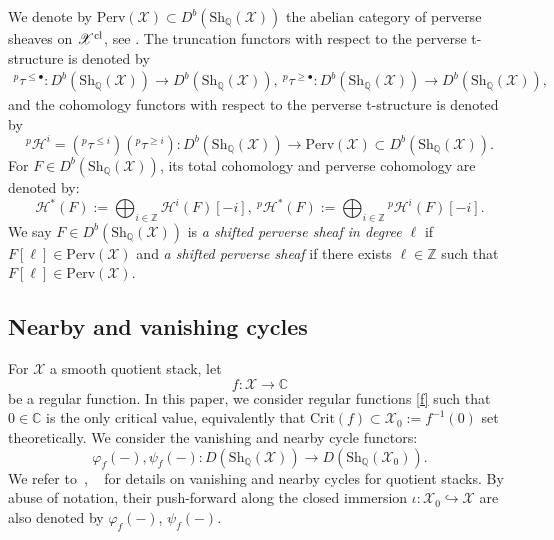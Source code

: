 \documentclass [11pt,oneside,a4paper,mathscr]{amsart}
\theoremstyle{definition}
\renewcommand{\leq}{\leqslant}
\renewcommand{\geq}{\geqslant}
\newcommand{\X}{\mathscr{X}}
\begin{document}
We denote by $\mathrm{Perv}(\X)\subset D^b(\mathrm{Sh}_{\mathbb{Q}}(\X))$ the abelian category of perverse sheaves on $\X^{\rm{cl}}$, see \cite{MR2480756}. 
The truncation functors with respect to the perverse 
t-structure is denoted by 
\begin{align*}
{}^p\tau^{\leq \bullet}\colon D^b(\mathrm{Sh}_{\mathbb{Q}}(\X))\to D^b(\mathrm{Sh}_{\mathbb{Q}}(\X)), \
{}^p\tau^{\geq \bullet}\colon D^b(\mathrm{Sh}_{\mathbb{Q}}(\X))\to D^b(\mathrm{Sh}_{\mathbb{Q}}(\X)),
\end{align*}
and the cohomology 
functors with respect to the perverse t-structure is denoted by 
\[
{}^p\mathcal{H}^i=({}^p\tau^{\leq i})
({}^p\tau^{\geq i})
\colon D^b(\mathrm{Sh}_{\mathbb{Q}}(\X))\to \mathrm{Perv}(\X) \subset D^b(\mathrm{Sh}_{\mathbb{Q}}(\X)).\] 
For $F\in D^b(\mathrm{Sh}_{\mathbb{Q}}(\X))$, its total cohomology and perverse cohomology are denoted by: 
\[
\mathcal{H}^{\ast}(F):=\bigoplus_{i\in \mathbb{Z}}\mathcal{H}^i(F)[-i], \ 
{}^p\mathcal{H}^{\ast}(F):=\bigoplus_{i\in\mathbb{Z}}{}^p\mathcal{H}^i(F)[-i].\]
We say $F\in D^b(\mathrm{Sh}_{\mathbb{Q}}(\X))$ is \textit{a shifted perverse sheaf in degree $\ell$} if $F[\ell]\in \mathrm{Perv}(\X)$ and \textit{a shifted perverse sheaf} if there exists $\ell\in\mathbb{Z}$ such that $F[\ell]\in \mathrm{Perv}(\X)$. 









\subsection{Nearby and vanishing cycles}\label{subsec:nearby}
For $\X$ a smooth quotient stack, let 
\begin{equation}\label{f}
f\colon \X\to\mathbb{C}
\end{equation}
be a regular function. In this paper, we consider regular functions \eqref{f} such that $0 \in \mathbb{C}$ is the only critical value, equivalently that $\mathrm{Crit}(f)\subset \X_0:=f^{-1}(0)$ set 
theoretically.
We consider the vanishing and nearby cycle functors:
\begin{equation}\label{psiphi}
\varphi_f(-), \psi_f(-)\colon D(\mathrm{Sh}_{\mathbb{Q}}(\X))\to D(\mathrm{Sh}_{\mathbb{Q}}(\X_0)).
\end{equation}
We refer to~\cite[Subsection 2.2]{MR3667216}, ~\cite[Proposition 2.13]{DM}
for details on vanishing and nearby cycles
for quotient stacks. 
By abuse of notation, their push-forward along the closed 
immersion $\iota\colon \X_0 \hookrightarrow\X$ 
are also denoted by $\varphi_f(-)$, $\psi_f(-)$. 
\end{document}
